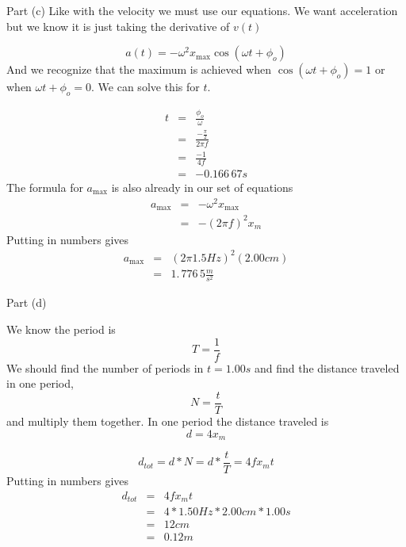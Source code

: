\documentclass{book}
\begin{document}
Part (c) Like with the velocity we must use our equations. We want
acceleration but we know it is just taking the derivative of $v\left(
t\right) $

\begin{equation*}
a\left( t\right) =-\omega ^{2}x_{\max }\cos \left( \omega t+\phi _{o}\right)
\end{equation*}%
And we recognize that the maximum is achieved when $\cos \left( \omega
t+\phi _{o}\right) =1$ or when $\omega t+\phi _{o}=0.$ We can solve this for 
$t.$

\begin{eqnarray*}
t &=&\frac{\phi _{o}}{\omega } \\
&=&\frac{-\frac{\pi }{2}}{2\pi f} \\
&=&\frac{-1}{4f} \\
&=&-0.166\,67\unit{s}
\end{eqnarray*}%
The formula for $a_{\max }$ is also already in our set of equations 
\begin{eqnarray*}
a_{\max } &=&-\omega ^{2}x_{\max } \\
&=&-(2\pi f)^{2}x_{m}
\end{eqnarray*}%
Putting in numbers gives%
\begin{eqnarray*}
a_{\max } &=&\left( 2\pi 1.5\unit{Hz}\right) ^{2}(2.00\unit{cm}) \\
&=&\allowbreak 1.\,\allowbreak 776\,5\frac{\unit{m}}{\unit{s}^{2}}
\end{eqnarray*}

Part (d)

We know the period is 
\begin{equation*}
T=\frac{1}{f}
\end{equation*}%
We should find the number of periods in $t=1.00\unit{s}$ and find the
distance traveled in one period, 
\begin{equation*}
N=\frac{t}{T}
\end{equation*}%
and multiply them together. In one period the distance traveled is 
\begin{equation*}
d=4x_{m}
\end{equation*}

\begin{equation*}
d_{tot}=d\ast N=d\ast \frac{t}{T}=4fx_{m}t
\end{equation*}%
Putting in numbers gives%
\begin{eqnarray*}
d_{tot} &=&4fx_{m}t \\
&=&4\ast 1.50\unit{Hz}\ast 2.00\unit{cm}\ast 1.00\unit{s} \\
&=&12\unit{cm} \\
&=&\allowbreak 0.12\unit{m}
\end{eqnarray*}
\end{document}
